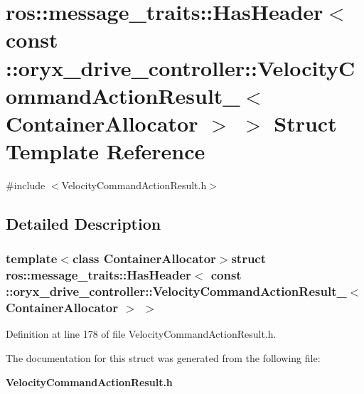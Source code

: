 \section{ros\-:\-:message\-\_\-traits\-:\-:\-Has\-Header$<$ const \-:\-:oryx\-\_\-drive\-\_\-controller\-:\-:\-Velocity\-Command\-Action\-Result\-\_\-$<$ \-Container\-Allocator $>$ $>$ \-Struct \-Template \-Reference}
\label{structros_1_1message__traits_1_1HasHeader_3_01const_01_1_1oryx__drive__controller_1_1VelocityCom4a40b4cb96f77b80c9a580e90465c6c1}


{\ttfamily \#include $<$\-Velocity\-Command\-Action\-Result.\-h$>$}



\subsection{\-Detailed \-Description}
\subsubsection*{template$<$class Container\-Allocator$>$struct ros\-::message\-\_\-traits\-::\-Has\-Header$<$ const \-::oryx\-\_\-drive\-\_\-controller\-::\-Velocity\-Command\-Action\-Result\-\_\-$<$ Container\-Allocator $>$ $>$}



\-Definition at line 178 of file \-Velocity\-Command\-Action\-Result.\-h.



\-The documentation for this struct was generated from the following file\-:\begin{DoxyCompactItemize}
\item 
{\bf \-Velocity\-Command\-Action\-Result.\-h}\end{DoxyCompactItemize}
